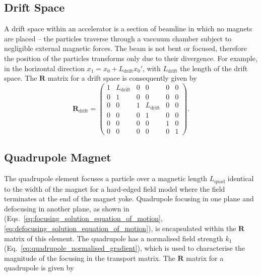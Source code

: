 \documentclass[../main.tex]{subfiles}
\begin{document}
\subsection{Drift Space}

A drift space within an accelerator is a section of beamline in which no magnets are placed -- the particles traverse through a vaccuum chamber subject to negligible external magnetic forces. The beam is not bent or focused, therefore the position of the particles transforms only due to their divergence. For example, in the horizontal direction $x_{1} = x_{0} + L_{\mathrm{drift}}x_{0}'$, with $L_{\mathrm{drift}}$ the length of the drift space. The $\boldsymbol{R}$ matrix for a drift space is consequently given by  
\begin{equation}
\boldsymbol{R}_{\mathrm{drift}} =
\begin{pmatrix}
1 & L_{\mathrm{drift}} & 0 & 0 & 0 & 0 \\
0 & 1 & 0 & 0 & 0 & 0 \\
0 & 0 & 1 & L_{\mathrm{drift}} & 0 & 0 \\
0 & 0 & 0 & 1 & 0 & 0 \\
0 & 0 & 0 & 0 & 1 & 0 \\
0 & 0 & 0 & 0 & 0 & 1
\end{pmatrix}.
\label{eq:drift_matrix}    
\end{equation}

\subsection{Quadrupole Magnet}

The quadrupole element focuses a particle over a magnetic length $L_{\mathrm{quad}}$ identical to the width of the magnet for a hard-edged field model where the field terminates at the end of the magnet yoke. Quadrupole focusing in one plane and defocusing in another plane, as shown in (Eqs.~\ref{eq:focusing_solution_equation_of_motion}, \ref{eq:defocusing_solution_equation_of_motion}), is encapsulated within the $\boldsymbol{R}$ matrix of this element. The quadrupole has a normalised field strength $k_{1}$ (Eq.~\ref{eq:quadrupole_normalised_gradient}), which is used to characterise the magnitude of the focusing in the transport matrix. The $\boldsymbol{R}$ matrix for a quadrupole is given by
\end{document}
